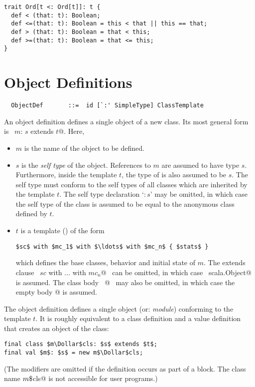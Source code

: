 \documentclass[a4paper,12pt,twoside,titlepage]{book}
\begin{document}
\begin{lstlisting}
trait Ord[t <: Ord[t]]: t {
  def < (that: t): Boolean;
  def <=(that: t): Boolean = this < that || this == that;
  def > (that: t): Boolean = that < this;
  def >=(that: t): Boolean = that <= this;
}
\end{lstlisting}

\section{Object Definitions}
\label{sec:modules}
\label{sec:object-defs}

\syntax\begin{lstlisting}
  ObjectDef       ::=  id [`:' SimpleType] ClassTemplate
\end{lstlisting}

An object definition defines a single object of a new class. Its 
most general form is
~\lstinline@object $m$: $s$ extends $t$@. Here,
\begin{itemize}
\item[]
$m$ is the name of the object to be defined.
\item[] $s$ is the {\em self type} of the object. References to
$m$ are assumed to have type $s$. Furthermore, inside the
template $t$, the type of  is also assumed to be $s$.
The self type must conform to the self types of all classes which are
inherited by the template $t$. The self type declaration
`$:s$' may be omitted, in which case the self type of the class is
assumed to be equal to the anonymous class defined by $t$.
\item[] 
$t$ is a
template () of the form
\begin{lstlisting}
$sc$ with $mc_1$ with $\ldots$ with $mc_n$ { $stats$ }
\end{lstlisting}
which defines the base classes, behavior and initial state of $m$.
The extends clause ~\lstinline@extends $sc$ with $\ldots$ with $mc_n$@~
can be omitted, in which case
~\lstinline@extends scala.Object@~ is assumed.  The class body
~@~ may also be omitted, in which case the empty body
\lstinline@{}@ is assumed.
\end{itemize}
The object definition defines a single object (or: {\em module})
conforming to the template $t$.  It is roughly equivalent to a class
definition and a value definition that creates an object of the class:
\begin{lstlisting}
final class $m\Dollar$cls: $s$ extends $t$;
final val $m$: $s$ = new m$\Dollar$cls;
\end{lstlisting}
(The  modifiers are omitted if the definition occurs as
part of a block. The class name \lstinline@$m\mbox{\$}$cls@ is not
accessible for user programs.)
\end{document}
